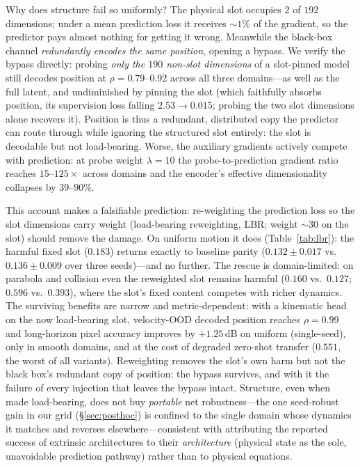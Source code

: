 Why does structure fail so uniformly? The physical slot occupies $2$ of $192$ dimensions; under a mean prediction loss it receives ${\sim}1\%$ of the gradient, so the predictor pays almost nothing for getting it wrong. Meanwhile the black-box channel \emph{redundantly encodes the same position}, opening a bypass. We verify the bypass directly: probing \emph{only the $190$ non-slot dimensions} of a slot-pinned model still decodes position at $\rho{=}0.79$--$0.92$ across all three domains---as well as the full latent, and undiminished by pinning the slot (which faithfully absorbs position, its supervision loss falling $2.53\!\to\!0.015$; probing the two slot dimensions alone recovers it). Position is thus a redundant, distributed copy the predictor can route through while ignoring the structured slot entirely: the slot is decodable but not load-bearing. Worse, the auxiliary gradients actively compete with prediction: at probe weight $\lambda{=}10$ the probe-to-prediction gradient ratio reaches $15$--$125\times$ across domains and the encoder's effective dimensionality collapses by $39$--$90\%$.

This account makes a falsifiable prediction: re-weighting the prediction loss so the slot dimensions carry weight (load-bearing reweighting, LBR; weight ${\sim}30$ on the slot) should remove the damage. On uniform motion it does (Table~\ref{tab:lbr}): the harmful fixed slot ($0.183$) returns exactly to baseline parity ($0.132\pm0.017$ vs.\ $0.136\pm0.009$ over three seeds)---and no further. The rescue is domain-limited: on parabola and collision even the reweighted slot remains harmful ($0.160$ vs.\ $0.127$; $0.596$ vs.\ $0.393$), where the slot's fixed content competes with richer dynamics. The surviving benefits are narrow and metric-dependent: with a kinematic head on the now load-bearing slot, velocity-OOD decoded position reaches $\rho{=}0.99$ and long-horizon pixel accuracy improves by $+1.25$\,dB on uniform (single-seed), only in smooth domains, and at the cost of degraded zero-shot transfer ($0.551$, the worst of all variants). Reweighting removes the slot's own harm but not the black box's redundant copy of position: the bypass survives, and with it the failure of every injection that leaves the bypass intact. Structure, even when made load-bearing, does not buy \emph{portable} net robustness---the one seed-robust gain in our grid (\S\ref{sec:posthoc}) is confined to the single domain whose dynamics it matches and reverses elsewhere---consistent with attributing the reported success of extrinsic architectures \citep{mao2024piwm} to their \emph{architecture} (physical state as the sole, unavoidable prediction pathway) rather than to physical equations.

